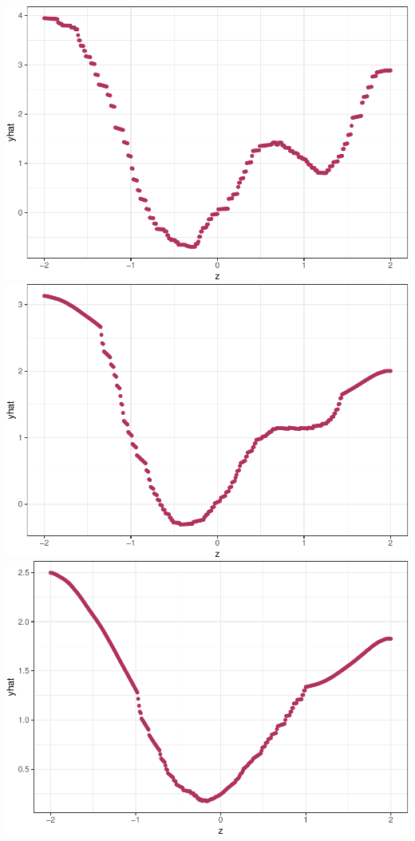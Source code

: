 \documentclass[]{article}
\begin{document}
\includegraphics{hw7_files/figure-latex/unnamed-chunk-3-1.pdf}
\includegraphics{hw7_files/figure-latex/unnamed-chunk-3-2.pdf}
\includegraphics{hw7_files/figure-latex/unnamed-chunk-3-3.pdf}
\end{document}
